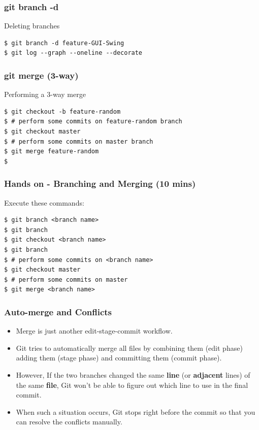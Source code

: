 \documentclass{beamer}
\begin{document}
\begin{frame}[fragile]
\frametitle{git branch -d}

Deleting branches

\begin{lstlisting}
$ git branch -d feature-GUI-Swing
$ git log --graph --oneline --decorate
\end{lstlisting}
\end{frame}


\begin{frame}[fragile]
\frametitle{git merge (3-way)}

Performing a 3-way merge

\begin{lstlisting}
$ git checkout -b feature-random
$ # perform some commits on feature-random branch
$ git checkout master
$ # perform some commits on master branch
$ git merge feature-random
$ 
\end{lstlisting}
\end{frame}



\begin{frame}[fragile]
\frametitle{Hands on - Branching and Merging (10 mins)}

Execute these commands:

\begin{lstlisting}
$ git branch <branch name>
$ git branch
$ git checkout <branch name>
$ git branch
$ # perform some commits on <branch name>
$ git checkout master
$ # perform some commits on master
$ git merge <branch name>
\end{lstlisting}
\end{frame}

\begin{frame}
\frametitle{Auto-merge and Conflicts}

\begin{itemize}

\item Merge is just another edit-stage-commit workflow.

\item Git tries to automatically merge all files by combining them (edit
phase) adding them (stage phase) and committing them (commit phase).

\item However, If the two branches changed the same \textbf{line}
(or \textbf{adjacent} lines) of the same \textbf{file}, Git won't be able to figure out which
line to use in the final commit. 

\item When such a situation occurs, Git stops right before the commit so that
you can resolve the conflicts manually.

\end{itemize}

\end{frame}
\end{document}
